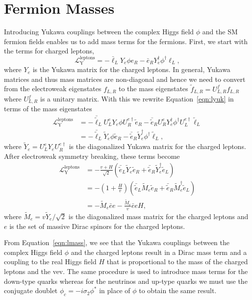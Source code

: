 \section{Fermion Masses}
\label{sec:yukawa}

Introducing Yukawa couplings between the complex Higgs field $\phi$ and the SM fermion fields enables us to add mass terms for the fermions.
First, we start with the terms for charged leptons,
\begin{equation}
  \label{eqn:lyuk}
  \mathcal{L}^{\text{leptons}}_{\text{Y}} = - \bar \ell_L Y_e \phi e_R - \bar e_R Y_e^\dagger \phi^\dagger \ell_L,
\end{equation}
where $Y_e$ is the Yukawa matrix for the charged leptons.
In general, Yukawa matrices and thus mass matrices are non-diagonal and hence we need to convert from the electroweak eigenstates $f_{L,R}$ to the mass eigenstates $\tilde{f}_{L,R} = U^{f}_{L,R} f_{L,R}$ where $U^{f}_{L,R}$ is a unitary matrix.
With this we rewrite Equation~\ref{eqn:lyuk} in terms of the mass eigenstates
\begin{align}
  \mathcal{L}^{\text{leptons}}_{\text{Y}} & = - \bar{\tilde{\ell}}_{L} U^e_L Y_e \phi U^{e\dagger}_R \tilde{e}_{R} - \bar{\tilde{e}}_{R} U^e_R Y_e^\dagger \phi^\dagger U^{e\dagger}_L \tilde{\ell}_{L} \nonumber \\
  & = - \bar{\tilde{\ell}}_{L} \tilde Y_e \phi \tilde{e}_{R} - \bar{\tilde{e}}_{R} \tilde Y_e^\dagger \phi^\dagger \tilde{\ell}_{L}, 
\end{align}
where $\tilde Y_e = U^e_L Y_e U^{e\dagger}_R$ is the diagonalized Yukawa matrix for the charged leptons.
After electroweak symmetry breaking, these terms become
\begin{align}
  \mathcal{L}^{\text{leptons}}_{\text{Y}} & = - \frac{v + H}{\sqrt{2}} \left( \bar{\tilde{e}}_L \tilde Y_e  \tilde{e}_R + \bar{\tilde{e}}_R \tilde Y_e^\dagger \tilde{e}_L \right) \nonumber \\
  & = - \left(1 + \frac{H}{v}\right) \left( \bar{\tilde{e}}_L \tilde M_e \tilde{e}_R + \bar{\tilde{e}}_R \tilde M_e^\dagger \tilde{e}_L \right) \nonumber \\
  & = - \tilde M_e \bar e e - \frac{\tilde M_e}{v} \bar e e H,
    \label{eqn:lmass}
\end{align}
where $\tilde M_e = v \tilde Y_e / \sqrt{2}$ is the diagonalized mass matrix for the charged leptons and $e$ is the set of massive Dirac spinors for the charged leptons.

From Equation~\ref{eqn:lmass}, we see that the Yukawa couplings between the complex Higgs field $\phi$ and the charged leptons result in a Dirac mass term and a coupling to the real Higgs field $H$ that is proportional to the mass of the charged leptons and the vev.
The same procedure is used to introduce mass terms for the down-type quarks whereas for the neutrinos and up-type quarks we must use the conjugate doublet $\phi_c = - i \sigma_2 \phi^*$ in place of $\phi$ to obtain the same result.

